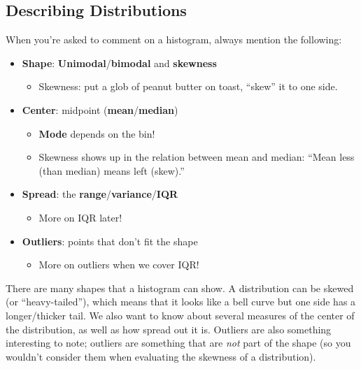\documentclass[
  letterpaper,
  DIV=11,
  numbers=noendperiod]{scrreprt}
\providecommand{\tightlist}{%
  \setlength{\itemsep}{0pt}\setlength{\parskip}{0pt}}\usepackage{longtable,booktabs,array}
\begin{document}
\hypertarget{describing-distributions}{%
\subsection{Describing Distributions}\label{describing-distributions}}

When you're asked to comment on a histogram, always mention the
following:

\begin{itemize}
\tightlist
\item
  \textbf{Shape}: \textbf{Unimodal}/\textbf{bimodal} and
  \textbf{skewness}

  \begin{itemize}
  \tightlist
  \item
    Skewness: put a glob of peanut butter on toast, ``skew'' it to one
    side.
  \end{itemize}
\item
  \textbf{Center}: midpoint (\textbf{mean}/\textbf{median})

  \begin{itemize}
  \tightlist
  \item
    \textbf{Mode} depends on the bin!
  \item
    Skewness shows up in the relation between mean and median: ``Mean
    less (than median) means left (skew).''
  \end{itemize}
\item
  \textbf{Spread}: the \textbf{range}/\textbf{variance}/\textbf{IQR}

  \begin{itemize}
  \tightlist
  \item
    More on IQR later!
  \end{itemize}
\item
  \textbf{Outliers}: points that don't fit the shape

  \begin{itemize}
  \tightlist
  \item
    More on outliers when we cover IQR!
  \end{itemize}
\end{itemize}

There are many shapes that a histogram can show. A distribution can be
skewed (or ``heavy-tailed''), which means that it looks like a bell
curve but one side has a longer/thicker tail. We also want to know about
several measures of the center of the distribution, as well as how
spread out it is. Outliers are also something interesting to note;
outliers are something that are \emph{not} part of the shape (so you
wouldn't consider them when evaluating the skewness of a distribution).
\end{document}

